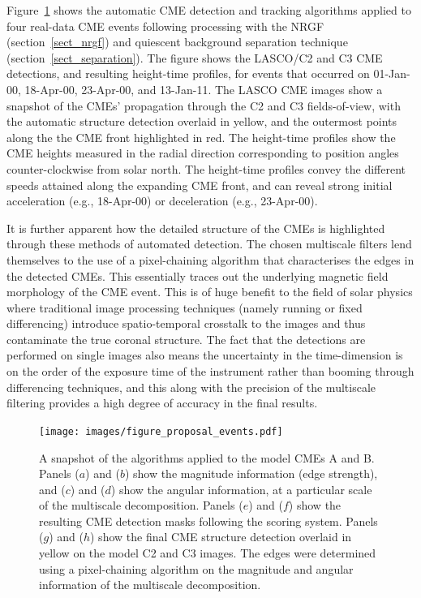 \documentclass[namedreferences]{SolarPhysics}
\begin{document}
\begin{article}
Figure~\ref{figure_proposal_events} shows the automatic CME detection and tracking algorithms applied to four real-data CME events following  processing with the NRGF (section~\ref{sect_nrgf}) and quiescent background separation technique (section~\ref{sect_separation}). The figure shows the LASCO/C2 and C3 CME detections, and resulting height-time profiles, for events that occurred on 01-Jan-00, 18-Apr-00, 23-Apr-00, and 13-Jan-11. The LASCO CME images show a snapshot of the CMEs' propagation through the C2 and C3 fields-of-view, with the automatic structure detection overlaid in yellow, and the outermost points along the the CME front highlighted in red. The height-time profiles show the CME heights measured in the radial direction corresponding to position angles counter-clockwise from solar north. The height-time profiles convey the different speeds attained along the expanding CME front, and can reveal strong initial acceleration (e.g., 18-Apr-00) or deceleration (e.g., 23-Apr-00).

It is further apparent how the detailed structure of the CMEs is highlighted through these methods of automated detection. The chosen multiscale filters lend themselves to the use of a pixel-chaining algorithm that characterises the edges in the detected CMEs. This essentially traces out the underlying magnetic field morphology of the CME event. This is of huge benefit to the field of solar physics where traditional image processing techniques (namely running or fixed differencing) introduce spatio-temporal crosstalk to the images and thus contaminate the true coronal structure. The fact that the detections are performed on single images also means the uncertainty in the time-dimension is on the order of the exposure time of the instrument rather than booming through differencing techniques, and this along with the precision of the multiscale filtering provides a high degree of accuracy in the final results.

\begin{figure}[!p*]
\centerline{\texttt{[image: images/figure\_proposal\_events.pdf]}}
\caption{A snapshot of the algorithms applied to the model CMEs A and B. Panels ($a$) and ($b$) show the magnitude information (edge strength), and ($c$) and ($d$) show the angular information, at a particular scale of the multiscale decomposition. Panels ($e$) and ($f$) show the resulting CME detection masks following the scoring system. Panels ($g$) and ($h$) show the final CME structure detection overlaid in yellow on the model C2 and C3 images. The edges were determined using a pixel-chaining algorithm on the magnitude and angular information of the multiscale decomposition.}
\label{figure_proposal_events}
\end{figure}






\end{article}
\end{document}
